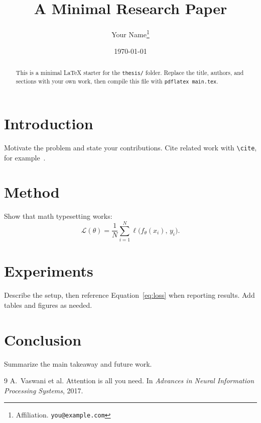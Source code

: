 \documentclass[11pt]{article}
\title{A Minimal Research Paper}
\author{Your Name\thanks{Affiliation. \texttt{you@example.com}}}
\date{\today}
\begin{document}
\maketitle

\begin{abstract}
This is a minimal \LaTeX{} starter for the \texttt{thesis/} folder. Replace the
title, authors, and sections with your own work, then compile this file with
\texttt{pdflatex main.tex}.
\end{abstract}

\section{Introduction}
Motivate the problem and state your contributions. Cite related work with
\verb|\cite|, for example~\cite{vaswani2017attention}.

\section{Method}
Show that math typesetting works:
\begin{equation}
  \mathcal{L}(\theta)
  = \frac{1}{N} \sum_{i=1}^{N} \ell\bigl(f_{\theta}(x_i),\, y_i\bigr).
  \label{eq:loss}
\end{equation}

\section{Experiments}
Describe the setup, then reference Equation~\eqref{eq:loss} when reporting
results. Add tables and figures as needed.

\section{Conclusion}
Summarize the main takeaway and future work.

\begin{thebibliography}{9}
A.~Vaswani et al.
\newblock Attention is all you need.
\newblock In \emph{Advances in Neural Information Processing Systems}, 2017.
\end{thebibliography}
\end{document}
